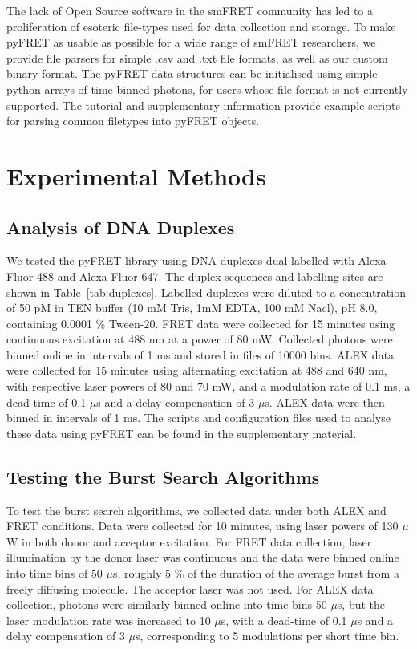 \documentclass[10pt]{article}
\begin{document}
The lack of Open Source software in the smFRET community has led to a proliferation of esoteric file-types used for data collection and storage. To make pyFRET as usable as possible for a wide range of smFRET researchers, we provide file parsers for simple .csv and .txt file formats, as well as our custom binary format. The pyFRET data structures can be initialised using simple python arrays of time-binned photons, for users whose file format is not currently supported. The tutorial and supplementary information provide example scripts for parsing common filetypes into pyFRET objects.

\section*{Experimental Methods}
\subsection*{Analysis of DNA Duplexes}
We tested the pyFRET library using DNA duplexes dual-labelled with Alexa Fluor 488 and Alexa Fluor 647. The duplex sequences and labelling sites are shown in Table~\ref{tab:duplexes}. Labelled duplexes were diluted to a concentration of 50 pM in TEN buffer (10 mM Tris, 1mM EDTA, 100 mM Nacl), pH 8.0, containing 0.0001 \% Tween-20. FRET data were collected for 15 minutes using continuous excitation at 488 nm at a power of 80 mW. Collected photons were binned online in intervals of 1 ms and stored in files of 10000 bins. ALEX data were collected for 15 minutes using alternating excitation at 488 and 640 nm, with respective laser powers of 80 and 70 mW, and a modulation rate of 0.1 ms, a dead-time of 0.1 $\mu$s and a delay compensation of 3 $\mu$s. ALEX data were then binned in intervals of 1 ms. The scripts and configuration files used to analyse these data using pyFRET can be found in the supplementary material.

\subsection*{Testing the Burst Search Algorithms}
To test the burst search algorithms, we collected data under both ALEX and FRET conditions. Data were collected for 10 minutes, using laser powers of 130 $\mu$W in both donor and acceptor excitation. For FRET data collection, laser illumination by the donor laser was continuous and the data were binned online into time bins of 50 $\mu$s, roughly 5 \% of the duration of the average burst from a freely diffusing molecule. The acceptor laser was not used. For ALEX data collection, photons were similarly binned online into time bins 50 $\mu$s, but the laser modulation rate was increased to 10 $\mu$s, with a dead-time of 0.1 $\mu$s and a delay compensation of 3 $\mu$s, corresponding to 5 modulations per short time bin. 
\end{document}
